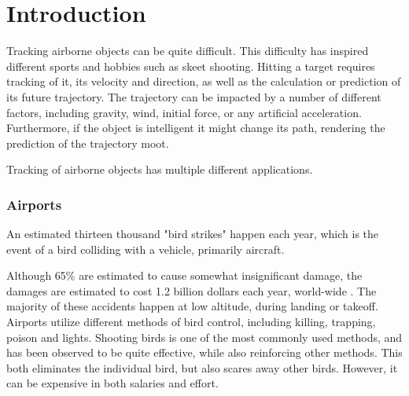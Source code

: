 
\chapter{Introduction}

Tracking airborne objects can be quite difficult.
This difficulty has inspired different sports and hobbies such as skeet shooting.
Hitting a target requires tracking of it, its velocity and direction, as well as the calculation or prediction of its future trajectory.
The trajectory can be impacted by a number of different factors, including gravity, wind, initial force, or any artificial acceleration.
Furthermore, if the object is intelligent it might change its path, rendering the prediction of the trajectory moot.


Tracking of airborne objects has multiple different applications.

\subsection{Airports}
An estimated thirteen thousand "bird strikes" happen each year, which is the event of a bird colliding with a vehicle, primarily aircraft\cite{WildlifeStrikeReport}.

Although 65\% are estimated to cause somewhat insignificant damage, the damages are estimated to cost 1.2 billion dollars each year, world-wide \cite{CostOfBirdstrikes}.
The majority of these accidents happen at low altitude, during landing or takeoff\cite{CostOfBirdstrikes}.
Airports utilize different methods of bird control, including killing, trapping, poison and lights\cite{BirdControlAtAirports}.
Shooting birds is one of the most commonly used methods, and has been observed to be quite effective, while also reinforcing other methods.
This both eliminates the individual bird, but also scares away other birds.
However, it can be expensive in both salaries and effort.

